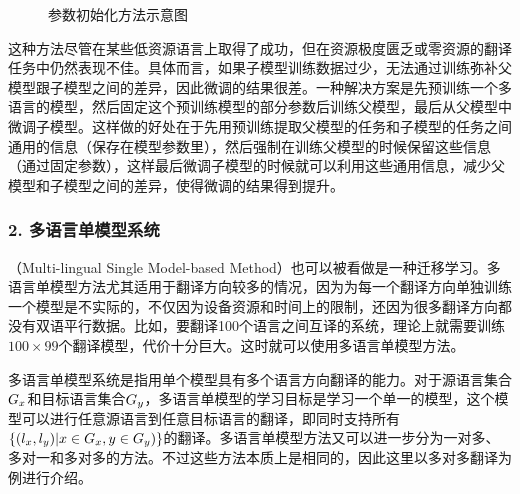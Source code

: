 \begin{figure}[h]
\centering

\caption{参数初始化方法示意图}
\label{fig:16-14}
\end{figure}

\parinterval 这种方法尽管在某些低资源语言上取得了成功，但在资源极度匮乏或零资源的翻译任务中仍然表现不佳。具体而言，如果子模型训练数据过少，无法通过训练弥补父模型跟子模型之间的差异，因此微调的结果很差。一种解决方案是先预训练一个多语言的模型，然后固定这个预训练模型的部分参数后训练父模型，最后从父模型中微调子模型。这样做的好处在于先用预训练提取父模型的任务和子模型的任务之间通用的信息（保存在模型参数里），然后强制在训练父模型的时候保留这些信息（通过固定参数），这样最后微调子模型的时候就可以利用这些通用信息，减少父模型和子模型之间的差异，使得微调的结果得到提升。

\subsubsection{2. 多语言单模型系统} \label{sec:multi-lang-single-model}

（Multi-lingual Single Model-based Method）也可以被看做是一种迁移学习。多语言单模型方法尤其适用于翻译方向较多的情况，因为为每一个翻译方向单独训练一个模型是不实际的，不仅因为设备资源和时间上的限制，还因为很多翻译方向都没有双语平行数据。比如，要翻译100个语言之间互译的系统，理论上就需要训练$100 \times 99$个翻译模型，代价十分巨大。这时就可以使用多语言单模型方法。

\parinterval 多语言单模型系统是指用单个模型具有多个语言方向翻译的能力。对于源语言集合${G}_x$和目标语言集合${G}_y$，多语言单模型的学习目标是学习一个单一的模型，这个模型可以进行任意源语言到任意目标语言的翻译，即同时支持所有$\{(l_x,l_y)|x \in {G}_x,y \in {G}_y)\}$的翻译。多语言单模型方法又可以进一步分为一对多、多对一和多对多的方法。不过这些方法本质上是相同的，因此这里以多对多翻译为例进行介绍。

